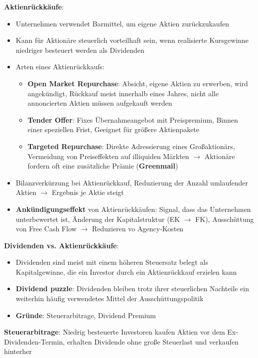 \textbf{Aktienrückkäufe}:
\begin{itemize}
	\item Unternehmen verwendet Barmittel, um eigene Aktien zurückzukaufen
	\item Kann für Aktionäre steuerlich vorteilhaft sein, wenn realisierte Kursgewinne niedriger besteuert werden als Dividenden
	\item Arten eines Aktienrückkaufs:
	\begin{itemize}
		\item \textbf{Open Market Repurchase}: Absicht, eigene Aktien zu erwerben, wird angekündigt, Rückkauf meist innerhalb eines Jahres, nicht alle
		annoncierten Aktien müssen aufgekauft werden
		\item \textbf{Tender Offer}: Fixes Übernahmeangebot mit Preispremium, Binnen einer speziellen Frist, Geeignet für größere Aktienpakete
		\item \textbf{Targeted Repurchase}: Direkte Adressierung eines Großaktionärs, Vermeidung von Preiseffekten auf illiquiden Märkten $\rightarrow$ Aktionäre fordern oft eine zusätzliche Prämie (\textbf{Greenmail})
	\end{itemize}
	\item Bilanzverkürzung bei Aktienrückkauf, Reduzierung der Anzahl umlaufender Aktien $\rightarrow$ Ergebnis je Aktie steigt
	\item \textbf{Ankündigungseffekt} von Aktienrückkäufen: Signal, dass das Unternehmen unterbewertet ist, Änderung der Kapitalstruktur (EK $\rightarrow$ FK), Ausschüttung von Free Cash Flow $\rightarrow$ Reduzieren vo Agency-Kosten
\end{itemize}
\bigskip
\textbf{Dividenden vs. Aktienrückkäufe}:
\begin{itemize}
	\item Dividenden sind meist mit einem höheren Steuersatz belegt als Kapitalgewinne, die ein Investor durch ein Aktienrückkauf erzielen kann
	\item \textbf{Dividend puzzle}: Dividenden bleiben trotz ihrer steuerlichen Nachteile ein weiterhin häufig verwendetes Mittel der Ausschüttungspolitik
	\item \textbf{Gründe}: Steuerarbitrage, Dividend Premium
\end{itemize}

\textbf{Steuerarbitrage}: Niedrig besteuerte Investoren kaufen Aktien vor dem Ex-Dividenden-Termin, erhalten Dividende ohne große Steuerlast und verkaufen hinterher

